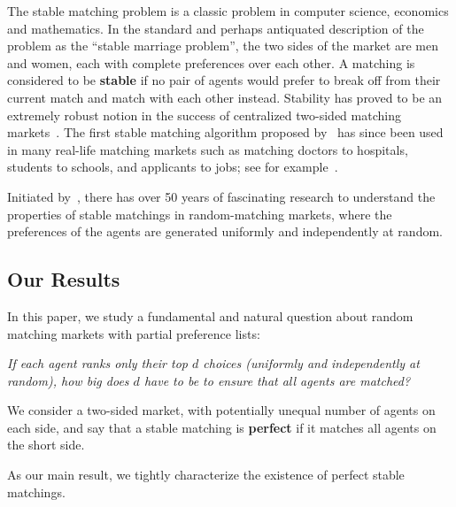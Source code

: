\documentclass[11pt]{amsart}
\newcommand{\quotebox}[1]
{\medbreak
\fcolorbox{white}{blue!15!gray!15}
{\begin{minipage}{0.95\linewidth}
{\emph{#1}}
\end{minipage}}
\medbreak}
\newcommand{\defn}{\textbf}
\begin{document}
The stable matching problem is a classic problem in computer science, economics and mathematics.  In the standard and perhaps antiquated description of the problem as the ``stable marriage problem'', the two sides of the market are men and women, each with complete preferences over each other.  A matching is considered to be \defn{stable} if no pair of agents would prefer to break off from their current match and match with each other instead. Stability has proved to be an extremely robust notion in the success of centralized two-sided matching markets~\cite{roth2002economist}.  The first stable matching algorithm proposed by~\cite{gale1962college} has since been used in many real-life matching markets such as matching doctors to hospitals, students to schools, and applicants to jobs; see for example~\cite{roth1999redesign,abdulkadirouglu2005new,abdulkadirouglu2005boston,correa2019school}.  



Initiated by~\cite{wilson1972analysis,knuth1976mariages}, there has over 50 years of fascinating research to understand the properties of stable matchings in random-matching markets, where the preferences of the agents are generated uniformly and independently at random.  


\subsection{Our Results} 
In this paper, we study a fundamental and natural question about random matching markets with partial preference lists: 
\quotebox{If each agent ranks only their top $d$ choices (uniformly and independently at random), how big does $d$ have to be to ensure that all agents are matched?} 
We consider a two-sided market, with potentially unequal number of agents on each side, and say that a stable matching is \defn{perfect} if it matches all agents on the short side. 


As our main result, we tightly characterize the existence of perfect stable matchings.
\end{document}
